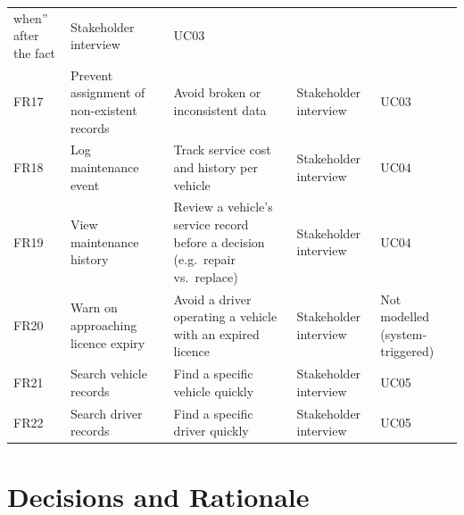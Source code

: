 \documentclass[11pt,a4paper]{article}
\begin{document}
\begin{longtable}{@{}p{1.2cm}p{4.0cm}p{4.3cm}p{2.5cm}p{1.3cm}@{}}
when'' after the fact & Stakeholder interview & UC03 \\
FR17 & Prevent assignment of non-existent records & Avoid broken or
inconsistent data & Stakeholder interview & UC03 \\
FR18 & Log maintenance event & Track service cost and history per
vehicle & Stakeholder interview & UC04 \\
FR19 & View maintenance history & Review a vehicle's service record
before a decision (e.g.\ repair vs.\ replace) & Stakeholder interview &
UC04 \\
FR20 & Warn on approaching licence expiry & Avoid a driver operating a
vehicle with an expired licence & Stakeholder interview & Not modelled
(system-triggered) \\
FR21 & Search vehicle records & Find a specific vehicle quickly &
Stakeholder interview & UC05 \\
FR22 & Search driver records & Find a specific driver quickly &
Stakeholder interview & UC05 \\
\bottomrule
\end{longtable}

\section{Decisions and Rationale}
\end{document}
